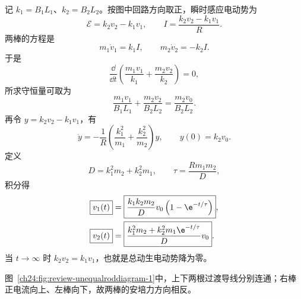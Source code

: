 \begin{xesolution}
记 $k_1=B_1L_1$、$k_2=B_2L_2$。按图中回路方向取正，瞬时感应电动势为
\begin{equation}
  \mathcal E=k_2v_2-k_1v_1,
  \qquad I=\frac{k_2v_2-k_1v_1}{R}.
\end{equation}
两棒的方程是
\begin{equation}
  m_1\dot v_1=k_1I,
  \qquad m_2\dot v_2=-k_2I.
\end{equation}
于是
\begin{equation}
  \frac{\dd}{\dd t}\left(\frac{m_1v_1}{k_1}+\frac{m_2v_2}{k_2}\right)=0,
\end{equation}
所求守恒量可取为
\begin{equation}
  \boxed{\frac{m_1v_1}{B_1L_1}+\frac{m_2v_2}{B_2L_2}
  =\frac{m_2v_0}{B_2L_2}}.
\end{equation}
再令 $y=k_2v_2-k_1v_1$，有
\begin{equation}
  \dot y=-\frac1R\left(\frac{k_1^2}{m_1}+\frac{k_2^2}{m_2}\right)y,
  \qquad
  y(0)=k_2v_0.
\end{equation}
定义
\begin{equation}
  D=k_1^2m_2+k_2^2m_1,
  \qquad \tau=\frac{Rm_1m_2}{D},
\end{equation}
积分得
\begin{align}
  \boxed{v_1(t)}&=\boxed{\frac{k_1k_2m_2}{D}v_0\left(1-\e^{-t/\tau}\right)},\\
  \boxed{v_2(t)}&=\boxed{\frac{k_1^2m_2+k_2^2m_1\e^{-t/\tau}}{D}v_0}.
\end{align}
当 $t\to\infty$ 时 $k_2v_2=k_1v_1$，也就是总动生电动势降为零。

图~\ref{ch24:fig:review-unequalroddiagram-1}中，上下两根过渡导线分别连通；右棒正电流向上、左棒向下，故两棒的安培力方向相反。
\par\noindent\begin{minipage}{\linewidth}
\unequalRodDiagram
{}\label{ch24:fig:review-unequalroddiagram-1}
\end{minipage}\par\medskip
\end{xesolution}

